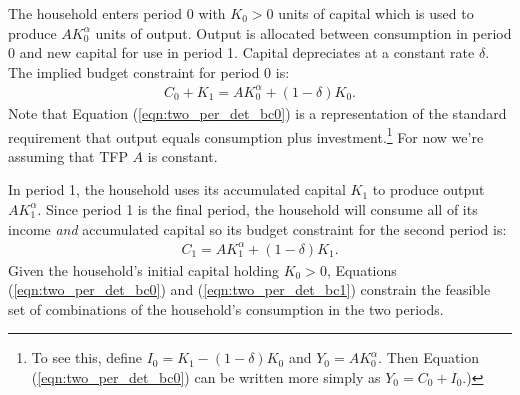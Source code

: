 \documentclass[12pt,fleqn]{article}
\newcommand{\EE}{\begin{eqnarray}}
\newcommand{\FF}{\end{eqnarray}}
\begin{document}
\begin{figure}[t]
\begin{center}
	\end{center}
	\end{figure}
	
The household enters period 0 with $K_0>0$ units of capital which is used to produce $AK_0^{\alpha}$ units of output. Output is allocated between consumption in period 0 and new capital for use in period 1. Capital depreciates at a constant rate $\delta$. The implied budget constraint for period 0 is:
	\EE
	\boxed{C_0 + K_1 = A K_0^{\alpha}  + (1-\delta)K_0}.  \label{eqn:two_per_det_bc0}
	\FF
Note that Equation (\ref{eqn:two_per_det_bc0}) is a representation of the standard requirement that output equals consumption plus investment.\footnote{To see this, define $I_0 = K_1 - (1-\delta)K_0$ and $Y_0 = AK_0^{\alpha}$. Then Equation (\ref{eqn:two_per_det_bc0}) can be written more simply as $Y_0 = C_0 + I_0$.)} For now we're assuming that TFP $A$ is constant. 

In period 1, the household uses its accumulated capital $K_1$ to produce output $AK_1^{\alpha}$. Since period 1 is the final period, the household will consume all of its income \emph{and} accumulated capital so its budget constraint for the second period is:
	\EE
	\boxed{C_1 = A K_1^{\alpha}  + (1-\delta)K_1}.  \label{eqn:two_per_det_bc1}
	\FF
Given the household's initial capital holding $K_0>0$, Equations (\ref{eqn:two_per_det_bc0}) and (\ref{eqn:two_per_det_bc1}) constrain the feasible set of combinations of the household's consumption in the two periods.
\end{document}
